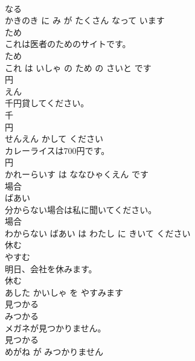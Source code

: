 \documentclass[8pt]{extreport}
\begin{document}
\begin{CJK}{UTF8}{min}
\\	なる 
\\	かきのき に み が たくさん なって います			
\\	ため	
\\	これは医者のためのサイトです。	
\\	ため 
\\	これ は いしゃ の ため の さいと です			
\\	円	
\\	えん			
\\	千円貸してください。	
\\	千 
\\	円 
\\	せんえん かして ください			
\\	カレーライスは700円です。	
\\	円 
\\	かれーらいす は ななひゃくえん です			
\\	場合	
\\	ばあい			
\\	分からない場合は私に聞いてください。	
\\	場合 
\\	わからない ばあい は わたし に きいて ください			
\\	休む	
\\	やすむ			
\\	明日、会社を休みます。	
\\	休む 
\\	あした かいしゃ を やすみます			
\\	見つかる	
\\	みつかる			
\\	メガネが見つかりません。	
\\	見つかる 
\\	めがね が みつかりません			
\end{CJK}
\end{document}
